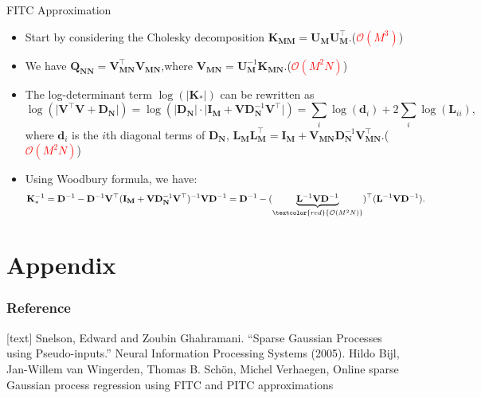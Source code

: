 \documentclass{beamer}
\begin{document}
\begin{frame}{FITC Approximation}
      \begin{itemize}
            \item Start by considering the Cholesky decomposition $\mathbf{K}_{\mathbf{MM}}=\mathbf{U}_{\mathbf{M}}\mathbf{U}_{\mathbf{M}}^{\top}$.(\textcolor{red}{$\mathcal{O}(M^3)$})
            \item We have $\mathbf{Q}_{\mathbf{NN}}=\mathbf{V}_{\mathbf{MN}}^{\top}\mathbf{V}_{\mathbf{MN}}$,where $\mathbf{V}_{\mathbf{MN}} = \mathbf{U}_{\mathbf{M}}^{-1}\mathbf{K}_{\mathbf{MN}}$.(\textcolor{red}{$\mathcal{O}(M^2N)$})
            \item The log-determinant term $\log(\lvert \mathbf{K}_*\rvert)$ can be rewritten as
            \[
                  \log(\lvert\mathbf{V}^{\top}\mathbf{V} +\mathbf{D}_{\mathbf{N}}\rvert )= \log(\lvert\mathbf{D}_{\mathbf{N}}\rvert\cdot\lvert \mathbf{I}_{\mathbf{M}}+\mathbf{V}\mathbf{D}_{\mathbf{N}}^{-1}\mathbf{V}^{\top}\rvert)=\sum_i\log(\mathbf{d}_i)+2\sum_i\log(\mathbf{L}_{ii}),
            \]
            where $\mathbf{d}_i$ is the $i$th diagonal terms of $\mathbf{D}_{\mathbf{N}}$, $\mathbf{L}_{\mathbf{M}}\mathbf{L}_{\mathbf{M}}^{\top}=\mathbf{I}_{\mathbf{M}}+\mathbf{V}_{\mathbf{MN}}\mathbf{D}_{\mathbf{N}}^{-1}\mathbf{V}_{\mathbf{MN}}^{\top}$.(\textcolor{red}{$\mathcal{O}(M^2N)$})
            \item Using Woodbury formula, we have:
            \[
                  \mathbf{K}_*^{-1} = \mathbf{D}^{-1}-\mathbf{D}^{-1} \mathbf{V}^{\top} (\mathbf{I}_{\mathbf{M}}+\mathbf{V}\mathbf{D}_{\mathbf{N}}^{-1}\mathbf{V}^{\top})^{-1}  \mathbf{V} \mathbf{D}^{-1}
                   = \mathbf{D}^{-1}-(\underbrace{\mathbf{L}^{-1}\mathbf{V}\mathbf{D}^{-1}}_{\textcolor{red}{\mathcal{O}(M^2N)}})^{\top}(\mathbf{L}^{-1}\mathbf{V}\mathbf{D}^{-1}).
            \]
            
      \end{itemize}
\end{frame}

\section{Appendix}
\begin{frame}
      \frametitle{Reference}
      \begin{thebibliography}{10}
            [text]
            Snelson, Edward and Zoubin Ghahramani. “Sparse Gaussian Processes using Pseudo-inputs.” Neural Information Processing Systems (2005).
            Hildo Bijl, Jan-Willem van Wingerden, Thomas B. Schön, Michel Verhaegen, Online sparse Gaussian process regression using FITC and PITC approximations
      \end{thebibliography}
\end{frame}
\backmatter
\end{document}
